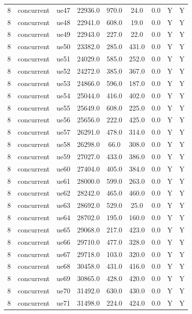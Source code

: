 \begin{table}[ht]
\begin{tabular}{|c|c|c|c|c|c|c|c|c|}
8 & concurrent & ue47 & 22936.0 & 970.0 & 24.0 & 0.0 & Y & Y \\
8 & concurrent & ue48 & 22941.0 & 608.0 & 19.0 & 0.0 & Y & Y \\
8 & concurrent & ue49 & 22943.0 & 227.0 & 22.0 & 0.0 & Y & Y \\
8 & concurrent & ue50 & 23382.0 & 285.0 & 431.0 & 0.0 & Y & Y \\
8 & concurrent & ue51 & 24029.0 & 585.0 & 252.0 & 0.0 & Y & Y \\
8 & concurrent & ue52 & 24272.0 & 385.0 & 367.0 & 0.0 & Y & Y \\
8 & concurrent & ue53 & 24866.0 & 596.0 & 187.0 & 0.0 & Y & Y \\
8 & concurrent & ue54 & 25044.0 & 416.0 & 402.0 & 0.0 & Y & Y \\
8 & concurrent & ue55 & 25649.0 & 608.0 & 225.0 & 0.0 & Y & Y \\
8 & concurrent & ue56 & 25656.0 & 222.0 & 425.0 & 0.0 & Y & Y \\
8 & concurrent & ue57 & 26291.0 & 478.0 & 314.0 & 0.0 & Y & Y \\
8 & concurrent & ue58 & 26298.0 & 66.0 & 308.0 & 0.0 & Y & Y \\
8 & concurrent & ue59 & 27027.0 & 433.0 & 386.0 & 0.0 & Y & Y \\
8 & concurrent & ue60 & 27404.0 & 405.0 & 384.0 & 0.0 & Y & Y \\
8 & concurrent & ue61 & 28000.0 & 599.0 & 263.0 & 0.0 & Y & Y \\
8 & concurrent & ue62 & 28242.0 & 465.0 & 460.0 & 0.0 & Y & Y \\
8 & concurrent & ue63 & 28692.0 & 529.0 & 25.0 & 0.0 & Y & Y \\
8 & concurrent & ue64 & 28702.0 & 195.0 & 160.0 & 0.0 & Y & Y \\
8 & concurrent & ue65 & 29068.0 & 217.0 & 423.0 & 0.0 & Y & Y \\
8 & concurrent & ue66 & 29710.0 & 477.0 & 328.0 & 0.0 & Y & Y \\
8 & concurrent & ue67 & 29718.0 & 103.0 & 320.0 & 0.0 & Y & Y \\
8 & concurrent & ue68 & 30458.0 & 431.0 & 416.0 & 0.0 & Y & Y \\
8 & concurrent & ue69 & 30865.0 & 428.0 & 420.0 & 0.0 & Y & Y \\
8 & concurrent & ue70 & 31492.0 & 630.0 & 430.0 & 0.0 & Y & Y \\
8 & concurrent & ue71 & 31498.0 & 224.0 & 424.0 & 0.0 & Y & Y \\

\end{tabular}
\end{table}
